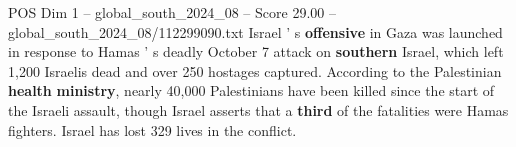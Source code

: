 \begin{textsample}{POS Dim 1 – global\_south\_2024\_08 – Score 29.00 – global\_south\_2024\_08/112299090.txt}
Israel ' s \textbf{offensive} in Gaza was launched in response to Hamas ' s deadly October 7 attack on \textbf{southern} Israel, which left 1,200 Israelis dead and over 250 hostages captured.
According to the Palestinian \textbf{health} \textbf{ministry}, nearly 40,000 Palestinians have been killed since the start of the Israeli assault, though Israel asserts that a \textbf{third} of the fatalities were Hamas fighters.
Israel has lost 329 lives in the conflict.

\end{textsample}
